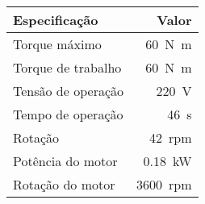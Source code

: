 \begin{tabular}{lr}
  \hline
  Especificação      & Valor                  \\
  \hline
  Torque máximo      & \SI{60}{\newton\meter} \\
  Torque de trabalho & \SI{60}{\newton\meter} \\
  Tensão de operação & \SI{220}{\volt}        \\
  Tempo de operação  & \SI{46}{\second}       \\
  Rotação            & \SI{42}{rpm}           \\
  Potência do motor  & \SI{0,18}{\kilo\watt}  \\
  Rotação do motor   & \SI{3600}{rpm}         \\
  \hline
\end{tabular}
